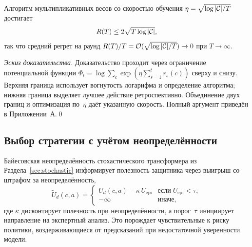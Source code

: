 \begin{theorem}
\label{thm:regret}
Алгоритм мультипликативных весов со скоростью обучения $\eta=\sqrt{\log|\mathcal{C}|/T}$ достигает
\begin{equation}
R(T)\le 2\sqrt{T\log|\mathcal{C}|},
\label{eq:game_regret_bound}
\end{equation}
так что средний регрет на раунд $R(T)/T=\mathcal{O}(\sqrt{\log|\mathcal{C}|/T})\to 0$ при $T\to\infty$.
\end{theorem}

\noindent\textit{Эскиз доказательства.} Доказательство проходит через ограничение потенциальной функции $\Phi_t=\log\sum_c\exp(\eta\sum_{s=1}^{t}r_s(c))$ сверху и снизу. Верхняя граница использует вогнутость логарифма и определение алгоритма; нижняя граница выделяет лучшее действие ретроспективно. Объединение двух границ и оптимизация по~$\eta$ даёт указанную скорость. Полный аргумент приведён в Приложении~А.\qed

\subsection{Выбор стратегии с учётом неопределённости}

Байесовская неопределённость стохастического трансформера из Раздела~\ref{sec:stochastic} информирует полезность защитника через выигрыш со штрафом за неопределённость,
\begin{equation}
\tilde{U}_d(c,a)
= \begin{cases}
U_d(c,a) - \kappa\,U_{\mathrm{epi}} & \text{если}\;U_{\mathrm{epi}}<\tau,\\
-\infty & \text{иначе},
\end{cases}
\label{eq:game_unc}
\end{equation}
где $\kappa$ дисконтирует полезность при неопределённости, а порог~$\tau$ инициирует направление на экспертный анализ. Это порождает чувствительные к риску политики, воздерживающиеся от предсказаний при недостаточной уверенности модели.

